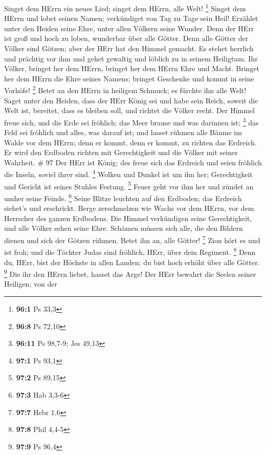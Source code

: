  Singet dem HErrn ein neues Lied; singet dem HErrn, alle
Welt! \footnote{\textbf{96:1} Ps 33,3}  Singet dem HErrn und
lobet seinen Namen; verkündiget von Tag zu Tage sein Heil! 
Erzählet unter den Heiden seine Ehre, unter allen Völkern seine Wunder.
 Denn der HErr ist groß und hoch zu loben, wunderbar über
alle Götter.  Denn alle Götter der Völker sind Götzen; aber
der HErr hat den Himmel gemacht.  Es stehet herrlich und
prächtig vor ihm und gehet gewaltig und löblich zu in seinem Heiligtum.
 Ihr Völker, bringet her dem HErrn, bringet her dem HErrn
Ehre und Macht.  Bringet her dem HErrn die Ehre seines
Namens; bringet Geschenke und kommt in seine Vorhöfe! \footnote{\textbf{96:8}
  Ps 72,10}  Betet an den HErrn in heiligem Schmuck; es
fürchte ihn alle Welt!  Saget unter den Heiden, dass der
HErr König sei und habe sein Reich, soweit die Welt ist, bereitet, dass
es bleiben soll, und richtet die Völker recht.  Der Himmel
freue sich, und die Erde sei fröhlich; das Meer brause und was darinnen
ist; \footnote{\textbf{96:11} Ps 98,7-9; Jes 49,13}  das
Feld sei fröhlich und alles, was darauf ist; und lasset rühmen alle
Bäume im Walde  vor dem HErrn; denn er kommt, denn er
kommt, zu richten das Erdreich. Er wird den Erdboden richten mit
Gerechtigkeit und die Völker mit seiner Wahrheit. \# 97  Der
HErr ist König; des freue sich das Erdreich und seien fröhlich die
Inseln, soviel ihrer sind. \footnote{\textbf{97:1} Ps 93,1} 
Wolken und Dunkel ist um ihn her; Gerechtigkeit und Gericht ist seines
Stuhles Festung. \footnote{\textbf{97:2} Ps 89,15}  Feuer
geht vor ihm her und zündet an umher seine Feinde. \footnote{\textbf{97:3}
  Hab 3,3-6}  Seine Blitze leuchten auf den Erdboden; das
Erdreich siehet's und erschrickt.  Berge zerschmelzen wie
Wachs vor dem HErrn, vor dem Herrscher des ganzen Erdbodens.
 Die Himmel verkündigen seine Gerechtigkeit, und alle Völker
sehen seine Ehre.  Schämen müssen sich alle, die den Bildern
dienen und sich der Götzen rühmen. Betet ihn an, alle Götter!
\footnote{\textbf{97:7} Hebr 1,6}  Zion hört es und ist
froh; und die Töchter Judas sind fröhlich, HErr, über dein Regiment.
\footnote{\textbf{97:8} Phil 4,4-5}  Denn du, HErr, bist der
Höchste in allen Landen; du bist hoch erhöht über alle Götter.
\footnote{\textbf{97:9} Ps 96,4}  Die ihr den HErrn liebet,
hasset das Arge! Der HErr bewahrt die Seelen seiner Heiligen; von der
